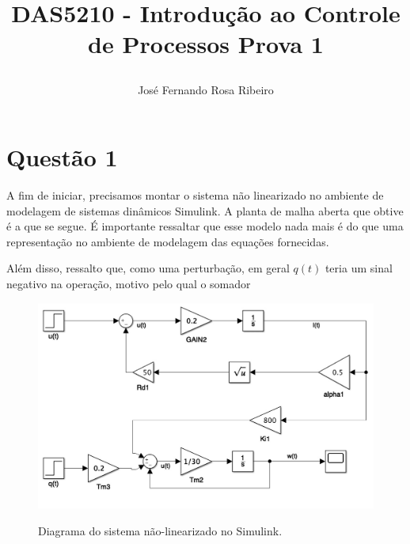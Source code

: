 \documentclass[11pt]{article}
\begin{document}
\author{
	José Fernando Rosa Ribeiro
}
	\title{DAS5210 - Introdução ao Controle de Processos
	\newline
	\newline
	\large Prova 1
	\date{\vspace{-5ex}}}
\maketitle
\setcounter{secnumdepth}{0}

\section{Questão 1}

A fim de iniciar, precisamos montar o sistema não linearizado no ambiente de modelagem de sistemas dinâmicos Simulink. 
A planta de malha aberta que obtive é a que se segue. 
É importante ressaltar que esse modelo nada mais é do que uma representação no ambiente de modelagem das equações fornecidas.

Além disso, ressalto que, como uma perturbação, em geral $q(t)$ teria um sinal negativo na operação, motivo pelo qual o somador 

\begin{figure}[H]
	\centering
	{\includegraphics[width=\textwidth]
		{assets/q1_non_linearized_schema.jpg}}
	\caption{Diagrama do sistema não-linearizado no Simulink.}
\end{figure}
\end{document}

